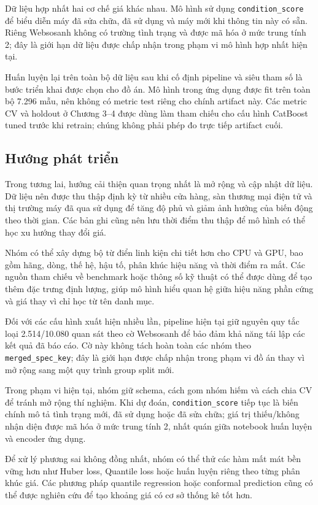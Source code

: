 Dữ liệu hợp nhất hai cơ chế giá khác nhau. Mô hình sử dụng \texttt{condition\_score} để biểu diễn máy đã sửa chữa, đã sử dụng và máy mới khi thông tin này có sẵn. Riêng Websosanh không có trường tình trạng và được mã hóa ở mức trung tính 2; đây là giới hạn dữ liệu được chấp nhận trong phạm vi mô hình hợp nhất hiện tại.

Huấn luyện lại trên toàn bộ dữ liệu sau khi cố định pipeline và siêu tham số là bước triển khai được chọn cho đồ án. Mô hình trong ứng dụng được fit trên toàn bộ 7.296 mẫu, nên không có metric test riêng cho chính artifact này. Các metric CV và holdout ở Chương 3--4 được dùng làm tham chiếu cho cấu hình CatBoost tuned trước khi retrain; chúng không phải phép đo trực tiếp artifact cuối.

\subsection{Hướng phát triển}

Trong tương lai, hướng cải thiện quan trọng nhất là mở rộng và cập nhật dữ liệu. Dữ liệu nên được thu thập định kỳ từ nhiều cửa hàng, sàn thương mại điện tử và thị trường máy đã qua sử dụng để tăng độ phủ và giảm ảnh hưởng của biến động theo thời gian. Các bản ghi cũng nên lưu thời điểm thu thập để mô hình có thể học xu hướng thay đổi giá.

Nhóm có thể xây dựng bộ từ điển linh kiện chi tiết hơn cho CPU và GPU, bao gồm hãng, dòng, thế hệ, hậu tố, phân khúc hiệu năng và thời điểm ra mắt. Các nguồn tham chiếu về benchmark hoặc thông số kỹ thuật có thể được dùng để tạo thêm đặc trưng định lượng, giúp mô hình hiểu quan hệ giữa hiệu năng phần cứng và giá thay vì chỉ học từ tên danh mục.

Đối với các cấu hình xuất hiện nhiều lần, pipeline hiện tại giữ nguyên quy tắc loại 2.514/10.080 quan sát theo cờ Websosanh để bảo đảm khả năng tái lập các kết quả đã báo cáo. Cờ này không tách hoàn toàn các nhóm theo \texttt{merged\_spec\_key}; đây là giới hạn được chấp nhận trong phạm vi đồ án thay vì mở rộng sang một quy trình group split mới.

Trong phạm vi hiện tại, nhóm giữ schema, cách gom nhóm hiếm và cách chia CV để tránh mở rộng thí nghiệm. Khi dự đoán, \texttt{condition\_score} tiếp tục là biến chính mô tả tình trạng mới, đã sử dụng hoặc đã sửa chữa; giá trị thiếu/không nhận diện được mã hóa ở mức trung tính 2, nhất quán giữa notebook huấn luyện và encoder ứng dụng.

Để xử lý phương sai không đồng nhất, nhóm có thể thử các hàm mất mát bền vững hơn như Huber loss, Quantile loss hoặc huấn luyện riêng theo từng phân khúc giá. Các phương pháp quantile regression hoặc conformal prediction cũng có thể được nghiên cứu để tạo khoảng giá có cơ sở thống kê tốt hơn.

